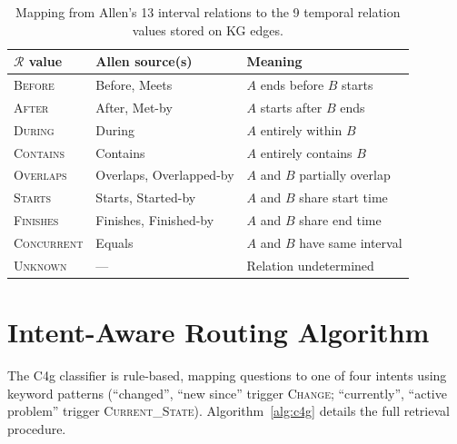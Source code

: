 \begin{table}[ht]
\centering
\small
\begin{tabular}{@{}lll@{}}
\toprule
\textbf{$\mathcal{R}$ value} & \textbf{Allen source(s)} & \textbf{Meaning} \\
\midrule
\textsc{Before} & Before, Meets & $A$ ends before $B$ starts \\
\textsc{After} & After, Met-by & $A$ starts after $B$ ends \\
\textsc{During} & During & $A$ entirely within $B$ \\
\textsc{Contains} & Contains & $A$ entirely contains $B$ \\
\textsc{Overlaps} & Overlaps, Overlapped-by & $A$ and $B$ partially overlap \\
\textsc{Starts} & Starts, Started-by & $A$ and $B$ share start time \\
\textsc{Finishes} & Finishes, Finished-by & $A$ and $B$ share end time \\
\textsc{Concurrent} & Equals & $A$ and $B$ have same interval \\
\textsc{Unknown} & --- & Relation undetermined \\
\bottomrule
\end{tabular}
\caption{Mapping from Allen's 13 interval relations to the 9 temporal relation values stored on KG edges.}
\label{tab:temporal_relations}
\end{table}


\section{Intent-Aware Routing Algorithm}
\label{app:routing}

The C4g classifier is rule-based, mapping questions to one of four intents using keyword patterns (\eg ``changed'', ``new since'' trigger \textsc{Change}; ``currently'', ``active problem'' trigger \textsc{Current\_State}).
Algorithm~\ref{alg:c4g} details the full retrieval procedure.

